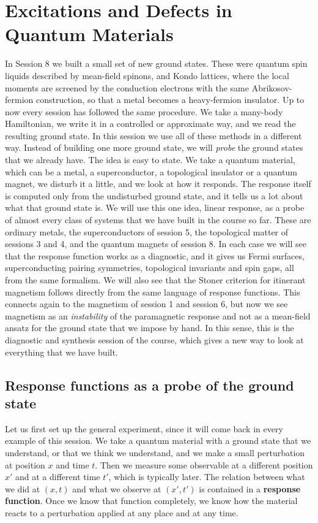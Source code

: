 \chapter{Excitations and Defects in Quantum Materials}

In Session 8 we built a small set of new ground states. These were quantum spin liquids described
by mean-field spinons, and Kondo lattices, where the local moments are screened by the conduction
electrons with the same Abrikosov-fermion construction, so that a metal becomes a heavy-fermion
insulator. Up to now every session has followed the same procedure. We take a many-body
Hamiltonian, we write it in a controlled or approximate way, and we read the resulting ground state. In this session we use all of these methods in a different way. Instead of building
one more ground state, we will \emph{probe} the ground states that we already have. The idea is easy
to state. We take a quantum material, which can be a metal, a superconductor, a topological insulator
or a quantum magnet, we disturb it a little, and we look at how it responds. The response itself is
computed only from the undisturbed ground state, and it tells us a lot about what that ground state
is. We will use this one idea, linear response, as a probe of almost every class of systems that
we have built in the course so far. These are ordinary metals, the superconductors of session 5,
the topological matter of sessions 3 and 4, and the quantum magnets of session 8. In each case we
will see that the response function works as a diagnostic, and it gives us Fermi surfaces,
superconducting pairing symmetries, topological invariants and spin gaps, all from the same formalism.
We will also see that the Stoner criterion for itinerant magnetism follows directly from the same
language of response functions. This connects again to the magnetism of session 1 and session 6, but
now we see magnetism as an \emph{instability} of the paramagnetic response and not as a mean-field
ansatz for the ground state that we impose by hand. In this sense, this is the diagnostic and synthesis
session of the course, which gives a new way to look at everything that we have built.

\section{Response functions as a probe of the ground state}

Let us first set up the general experiment, since it will come back in every example of this
session. We take a quantum material with a ground state that we understand,
or that we think we understand, and we make a small perturbation at position $x$ and time $t$. Then we
measure some observable at a different position $x'$ and at a different time $t'$, which is
typically later. The relation between what we did at $(x,t)$ and what we observe at $(x',t')$ is
contained in a \textbf{response
function}. Once we know that function completely, we know how the material reacts to a
perturbation applied at any place and at any time.

